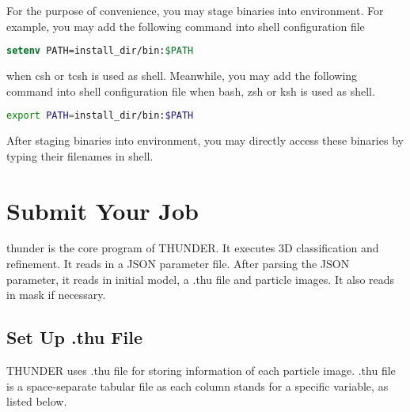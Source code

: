\documentclass{article}
\begin{document}
                For the purpose of convenience, you may stage binaries into environment. For example, you may add the following command into shell configuration file
                
                \begin{lstlisting}[language={csh}]
setenv PATH=install_dir/bin:$PATH
                \end{lstlisting}
                
                when \textsf{csh} or \textsf{tcsh} is used as shell. Meanwhile, you may add the following command into shell configuration file when \textsf{bash}, \textsf{zsh} or \textsf{ksh} is used as shell.
                
                \begin{lstlisting}[language={bash}]
export PATH=install_dir/bin:$PATH
                \end{lstlisting}
                
                After staging binaries into environment, you may directly access these binaries by typing their filenames in shell.
                
    \section{Submit Your Job}
    
        \textsf{thunder} is the core program of THUNDER. It executes 3D classification and refinement. It reads in a JSON parameter file. After parsing the JSON parameter, it reads in initial model, a \textsf{.thu} file and particle images. It also reads in mask if necessary.
              
        \subsection{Set Up \textsf{.thu} File}
        
            THUNDER uses \textsf{.thu} file for storing information of each particle image. \textsf{.thu} file is a space-separate tabular file as each column stands for a specific variable, as listed below.
            
\end{document}
